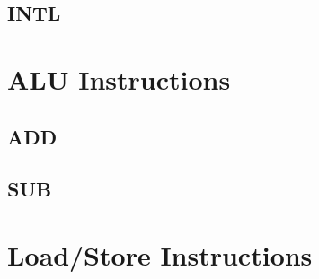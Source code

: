 \documentclass[a4paper]{report}
\begin{document}
\section{INTL}

\chapter{ALU Instructions}

\section{ADD}

\section{SUB}

\chapter{Load/Store Instructions}
\end{document}
